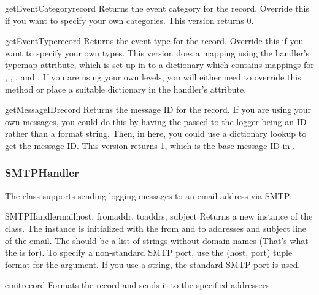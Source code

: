 \begin{methoddesc}{getEventCategory}{record}
Returns the event category for the record. Override this if you
want to specify your own categories. This version returns 0.
\end{methoddesc}

\begin{methoddesc}{getEventType}{record}
Returns the event type for the record. Override this if you want
to specify your own types. This version does a mapping using the
handler's typemap attribute, which is set up in 
to a dictionary which contains mappings for ,
, ,  and
. If you are using your own levels, you will either need
to override this method or place a suitable dictionary in the
handler's  attribute.
\end{methoddesc}

\begin{methoddesc}{getMessageID}{record}
Returns the message ID for the record. If you are using your
own messages, you could do this by having the  passed to the
logger being an ID rather than a format string. Then, in here,
you could use a dictionary lookup to get the message ID. This
version returns 1, which is the base message ID in
.
\end{methoddesc}

\subsubsection{SMTPHandler}

The  class supports sending logging messages to an email
address via SMTP.

\begin{classdesc}{SMTPHandler}{mailhost, fromaddr, toaddrs, subject}
Returns a new instance of the  class. The
instance is initialized with the from and to addresses and subject
line of the email. The  should be a list of strings without
domain names (That's what the  is for). To specify a
non-standard SMTP port, use the (host, port) tuple format for the
 argument. If you use a string, the standard SMTP port
is used.
\end{classdesc}

\begin{methoddesc}{emit}{record}
Formats the record and sends it to the specified addressees.
\end{methoddesc}

